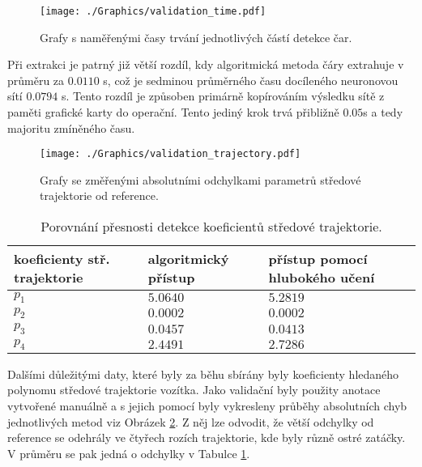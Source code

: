 \documentclass[czech, bc, kky, he, iso690numb]{fasthesis}
\begin{document}
        		\begin{figure}[h]
        			\centering
        			\texttt{[image: ./Graphics/validation\_time.pdf]}
        			\caption{Grafy s naměřenými časy trvání jednotlivých částí detekce čar.}
        			\label{pic:validation_time}
        		\end{figure}
        	
        	Při extrakci je patrný již větší rozdíl, kdy algoritmická metoda čáry extrahuje v průměru za \(0.0110\) s, což je sedminou průměrného času docíleného neuronovou sítí \(0.0794\) s. Tento rozdíl je způsoben primárně kopírováním výsledku sítě z paměti grafické karty do operační. Tento jediný krok trvá přibližně \(0.05\)s a tedy majoritu zmíněného času.
        		
        		\begin{figure}[h]
        			\centering
        			\texttt{[image: ./Graphics/validation\_trajectory.pdf]}
        			\caption{Grafy se změřenými absolutními odchylkami parametrů středové trajektorie od reference.}
        			\label{pic:validation_params}
        		\end{figure}
        		
        		\begin{table}[ht]
        			\centering
        			\caption{Porovnání přesnosti detekce koeficientů středové trajektorie.}
        			\label{tab}
        			\begin{tabular}{p{0.2\textwidth}p{}p{}}
        				\toprule[1.5pt]
        				\textbf{koeficienty stř. trajektorie} & \textbf{algoritmický přístup} & \textbf{přístup pomocí hlubokého učení}\\
        				\midrule
        				\(p_1\) & \(5.0640\) & \(5.2819\) \\
        				\(p_2\) & \(0.0002\) & \(0.0002\) \\
        				\(p_3\) & \(0.0457\) & \(0.0413\) \\
        				\(p_4\) & \(2.4491\) & \(2.7286\) \\
        				\bottomrule[1.5pt]
        			\end{tabular}
        		\end{table}
        		
        	Dalšími důležitými daty, které byly za běhu sbírány byly koeficienty hledaného polynomu středové trajektorie vozítka. Jako validační byly použity anotace vytvořené manuálně a s jejich pomocí byly vykresleny průběhy absolutních chyb jednotlivých metod viz Obrázek \ref{pic:validation_params}. Z něj lze odvodit, že větší odchylky od reference se odehrály ve čtyřech rozích trajektorie, kde byly různě ostré zatáčky. V průměru se pak jedná o  odchylky v Tabulce \ref{tab}.
        		
\end{document}

